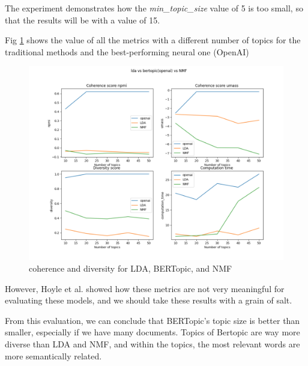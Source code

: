 The experiment demonstrates how the \textit{min\_topic\_size} value of 5 is too small, so that the results will be with a value of 15.

Fig \ref{figure:unsupervised_results} shows the value of all the metrics with a different number of topics for the traditional methods and the best-performing neural one (OpenAI)

\begin{figure}[h]
    \centering %
        \includegraphics[width=0.99\linewidth]{Chapter4/figures/topic_unsupervised.png} 
    \caption{coherence and diversity for LDA, BERTopic, and NMF
    }
    \label{figure:unsupervised_results} 
\end{figure}


However, Hoyle et al. \cite{hoyle_is_2021} showed how these metrics are not very meaningful for evaluating these models, and we should take these results with a grain of salt.

From this evaluation, we can conclude that BERTopic's topic size is better than smaller, especially if we have many documents. Topics of Bertopic are way more diverse than LDA and NMF, and within the topics, the most relevant words are more semantically related.


